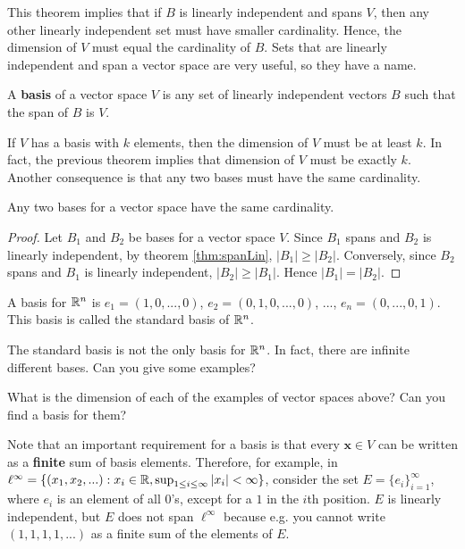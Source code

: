 This theorem implies that if $B$ is linearly independent and spans
$V$, then any other linearly independent set must have smaller
cardinality. Hence, the dimension of $V$ must equal the cardinality of
$B$. Sets that are linearly independent and span a vector space are
very useful, so they have a name.
\begin{definition}
  A \textbf{basis} of a vector space $V$ is any set of linearly
  independent vectors $B$ such that the span of $B$ is $V$.
\end{definition}
If $V$ has a basis with $k$ elements, then the dimension of $V$ must
be at least $k$. In fact, the previous theorem implies that dimension
of $V$ must be exactly $k$. Another consequence is that any two bases must have
the same cardinality. 
\begin{corollary}
  Any two bases for a vector space have the same cardinality.
\end{corollary}
\begin{proof}
  Let $B_1$ and $B_2$ be bases for a vector space $V$. Since $B_1$
  spans and $B_2$ is linearly independent, by theorem
  \ref{thm:spanLin}, $|B_1| \geq |B_2|$. Conversely, since $B_2$ spans
  and $B_1$ is linearly independent, $|B_2| \geq |B_1|$. Hence $|B_1|
  = |B_2|$.
\end{proof}
\begin{example}
  A basis for $\mathbb{R}^n$ is $e_1 = (1, 0, ..., 0 )$, $e_2 = (0, 1, 0, ...,
  0)$, $...$, $e_n = (0, ... , 0 , 1)$. This basis is called the
  standard basis of $\mathbb{R}^n$. 

  The standard basis is not the only basis for $\mathbb{R}^n$. In fact, there
  are infinite different bases. Can you give some examples?
\end{example}
\begin{exercise} 
  What is the dimension of each of the examples of vector spaces
  above? Can you find a basis for them? 
  
  Note that an important requirement for a basis is that every
  $\mathbf{x} \in V$ can be written as a \textbf{finite} sum of basis
  elements. Therefore, for example, in
  $\ell^\infty = \{(x_1, x_2, ...): x_i \in \mathbb{R}, \sup_{1\leq i\leq
    \infty} \left\vert {x_i} \right\vert < \infty\}$,
  consider the set $E = \{e_i\}_{i=1}^\infty$, where $e_i$ is an
  element of all $0$'s, except for a $1$ in the $i$th position. $E$ is
  linearly independent, but $E$ does not span $\ell^\infty$ because
  e.g. you cannot write $(1,1,1,1,...)$ as a finite sum of the
  elements of $E$.
\end{exercise}
